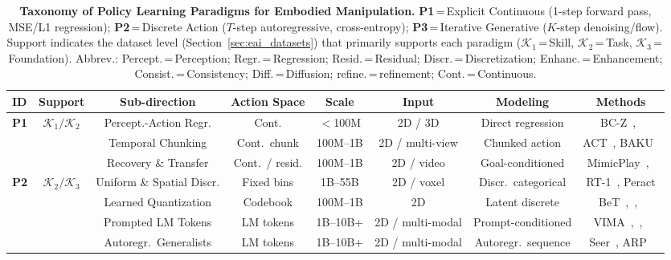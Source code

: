 \documentclass[acmsmall,screen,review]{acmart}
\begin{document}
\begin{table}[t!]
\centering
\caption{\textbf{Taxonomy of Policy Learning Paradigms for Embodied Manipulation.} \textbf{P1}\,=\,Explicit Continuous (1-step forward pass, MSE/L1 regression); \textbf{P2}\,=\,Discrete Action ($T$-step autoregressive, cross-entropy); \textbf{P3}\,=\,Iterative Generative ($K$-step denoising/flow). Support indicates the dataset level (Section~\ref{sec:eai_datasets}) that primarily supports each paradigm ($\mathcal{K}_1$\,=\,Skill, $\mathcal{K}_2$\,=\,Task, $\mathcal{K}_3$\,=\,Foundation). Abbrev.: Percept.\,=\,Perception; Regr.\,=\,Regression; Resid.\,=\,Residual; Discr.\,=\,Discretization; Enhanc.\,=\,Enhancement; Consist.\,=\,Consistency; Diff.\,=\,Diffusion; refine.\,=\,refinement; Cont.\,=\,Continuous.}\label{tab:policy_paradigms}
\renewcommand{\arraystretch}{1.15}
\setlength{\tabcolsep}{2.5pt}
\scriptsize
\begin{tabular}{
  l
  c
  c
  c
  c
  c
  c
  c
}
\toprule
\textbf{ID} &
\textbf{Support} &
\textbf{Sub-direction} &
\textbf{Action Space} &
\textbf{Scale} &
\textbf{Input} &
\textbf{Modeling} &
\textbf{Methods} \\
\midrule
\multirow{3}{*}{\textbf{P1}}
 & \multirow{3}{*}{$\mathcal{K}_1/\mathcal{K}_2$} & Percept.-Action Regr. & Cont. & {$<$100M} & 2D / 3D & Direct regression & BC-Z~\cite{jang2022bc},~\cite{haldar2025pointpolicy} \\
 & & Temporal Chunking & Cont.\ chunk & {100M--1B} & 2D / multi-view & Chunked action & ACT~\cite{zhao2023learning}, BAKU~\cite{haldar2024baku} \\
 & & Recovery \& Transfer & Cont.\ / resid. & {100M--1B} & 2D / video & Goal-conditioned & MimicPlay~\cite{wang2023mimicplay},~\cite{ren2025motion_tracks} \\
\midrule
\multirow{4}{*}{\textbf{P2}}
 & \multirow{4}{*}{$\mathcal{K}_2/\mathcal{K}_3$} & Uniform \& Spatial Discr. & Fixed bins & {1B--55B} & 2D / voxel & Discr.\ categorical & RT-1~\cite{brohan2023rt1}, Peract\cite{shridhar2022peract} \\
 & & Learned Quantization & Codebook & {100M--1B} & 2D & Latent discrete & BeT~\cite{shafiullah2022bet},~\cite{lee2024vqbet},~\cite{gong2025carp} \\
 & & Prompted LM Tokens & LM tokens & {1B--10B+} & 2D / multi-modal & Prompt-conditioned & VIMA~\cite{jiang2023vima},~\cite{wu2023gr1},~\cite{fu2025icil} \\
 & & Autoregr.\ Generalists & LM tokens & {1B--10B+} & 2D / multi-modal & Autoregr.\ sequence & Seer~\cite{tian2024seer}, ARP~\cite{zhang2025arp} \\

\end{tabular}
\end{table}
\end{document}
